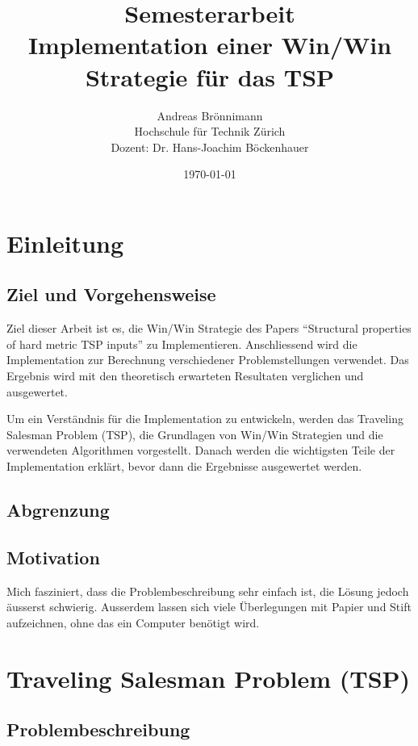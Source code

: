 \documentclass[a4paper]{article}
\title {Semesterarbeit\\
Implementation einer Win/Win Strategie für das TSP\\}
\author {Andreas Brönnimann\\
Hochschule für Technik Zürich\\
Dozent: Dr. Hans-Joachim Böckenhauer}
\date {\today}
\begin{document}
\nocite{*}

\maketitle
\setcounter{page}{0}
\thispagestyle{empty}
\newpage

\tableofcontents
\newpage
\section{Einleitung}
\subsection{Ziel und Vorgehensweise}
Ziel dieser Arbeit ist es, die Win/Win Strategie des Papers "`Structural properties of hard metric TSP inputs"'\cite{moemke11} zu Implementieren. Anschliessend wird die Implementation zur Berechnung verschiedener Problemstellungen verwendet. Das Ergebnis wird mit den theoretisch erwarteten Resultaten verglichen und ausgewertet.

Um ein Verständnis für die Implementation zu entwickeln, werden das Traveling Salesman Problem (TSP), die Grundlagen von Win/Win Strategien und die verwendeten Algorithmen vorgestellt. Danach werden die wichtigsten Teile der Implementation erklärt, bevor dann die Ergebnisse ausgewertet werden. 

\subsection{Abgrenzung}
\subsection{Motivation}
Mich fasziniert, dass die Problembeschreibung sehr einfach ist, die Lösung jedoch äusserst schwierig.
Ausserdem lassen sich viele Überlegungen mit Papier und Stift aufzeichnen, ohne das ein Computer benötigt wird. 

\newpage
\section{Traveling Salesman Problem (TSP)}
\subsection{Problembeschreibung}
\end{document}
